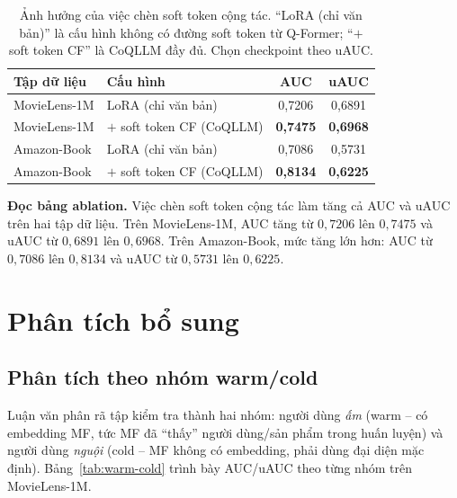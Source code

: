\begin{table}[ht]
\caption{Ảnh hưởng của việc chèn soft token cộng tác. ``LoRA (chỉ văn bản)'' là cấu hình không
có đường soft token từ Q-Former; ``$+$ soft token CF'' là CoQLLM đầy đủ. Chọn checkpoint theo
uAUC.}
\label{tab:ablation}
\begin{center}
\begin{tabular}{|L{2.6cm}|L{4.6cm}|c|c|}
\hline
\textbf{Tập dữ liệu} & \textbf{Cấu hình} & \textbf{AUC} & \textbf{uAUC} \\
\hline
MovieLens-1M & LoRA (chỉ văn bản) & 0{,}7206 & 0{,}6891 \\
\hline
MovieLens-1M & $+$ soft token CF (CoQLLM) & \textbf{0{,}7475} & \textbf{0{,}6968} \\
\hline
Amazon-Book & LoRA (chỉ văn bản) & 0{,}7086 & 0{,}5731 \\
\hline
Amazon-Book & $+$ soft token CF (CoQLLM) & \textbf{0{,}8134} & \textbf{0{,}6225} \\
\hline
\end{tabular}
\end{center}
\end{table}

\textbf{Đọc bảng ablation.} Việc chèn soft token cộng tác làm tăng cả AUC và uAUC trên hai tập
dữ liệu. Trên MovieLens-1M, AUC tăng từ $0{,}7206$ lên $0{,}7475$ và uAUC từ $0{,}6891$ lên
$0{,}6968$. Trên Amazon-Book, mức tăng lớn hơn: AUC từ $0{,}7086$ lên $0{,}8134$ và uAUC từ
$0{,}5731$ lên $0{,}6225$.

\section{Phân tích bổ sung}
\label{sec:phan-tich-bo-sung}

\subsection{Phân tích theo nhóm warm/cold}
\label{ssec:user-group}

Luận văn phân rã tập kiểm tra thành hai nhóm: người dùng
\textit{ấm} (warm -- có embedding MF, tức MF đã ``thấy'' người dùng/sản phẩm trong huấn luyện)
và người dùng \textit{nguội} (cold -- MF không có embedding, phải dùng đại diện mặc định).
Bảng~\ref{tab:warm-cold} trình bày AUC/uAUC theo từng nhóm trên MovieLens-1M.

